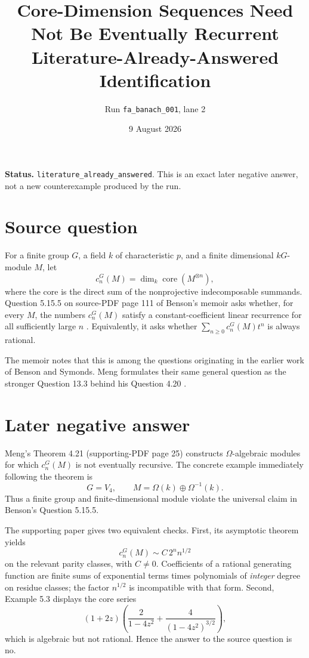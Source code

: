 \documentclass[11pt]{article}
\title{Core-Dimension Sequences Need Not Be Eventually Recurrent\\
\large Literature-Already-Answered Identification}
\author{Run \texttt{fa\_banach\_001}, lane 2}
\date{9 August 2026}
\newcommand{\core}{\operatorname{core}}
\begin{document}
\maketitle

\noindent\textbf{Status.}
\texttt{literature\_already\_answered}. This is an exact later negative
answer, not a new counterexample produced by the run.

\section{Source question}

For a finite group $G$, a field $k$ of characteristic $p$, and a finite
dimensional $kG$-module $M$, let
\[
 c_n^G(M)=\dim_k\core(M^{\otimes n}),
\]
where the core is the direct sum of the nonprojective indecomposable summands.
Question 5.15.5 on source-PDF page 111 of Benson's memoir asks whether, for
every $M$, the numbers $c_n^G(M)$ satisfy a constant-coefficient linear
recurrence for all sufficiently large $n$ \cite{benson}. Equivalently, it asks
whether $\sum_{n\geq0}c_n^G(M)t^n$ is always rational.

The memoir notes that this is among the questions originating in the earlier
work of Benson and Symonds. Meng formulates their same general question as
the stronger Question 13.3 behind his Question 4.20 \cite{meng}.

\section{\hspace{0.35em}Later negative answer}

Meng's Theorem 4.21 (supporting-PDF page 25) constructs
$\Omega$-algebraic modules for which $c_n^G(M)$ is not eventually recursive.
The concrete example immediately following the theorem is
\[
 G=V_4,\qquad M=\Omega(k)\oplus\Omega^{-1}(k).
\]
Thus a finite group and finite-dimensional module violate the universal
claim in Benson's Question 5.15.5.

The supporting paper gives two equivalent checks. First, its asymptotic
theorem yields
\[
 c_n^G(M)\sim C\,2^n n^{1/2}
\]
on the relevant parity classes, with $C\neq0$. Coefficients of a rational
generating function are finite sums of exponential terms times polynomials
of \emph{integer} degree on residue classes; the factor $n^{1/2}$ is
incompatible with that form. Second, Example 5.3 displays the core series
\[
 (1+2z)\left(
   \frac{2}{1-4z^2}+\frac{4}{(1-4z^2)^{3/2}}
 \right),
\]
which is algebraic but not rational. Hence the answer to the source question
is no.
\end{document}
